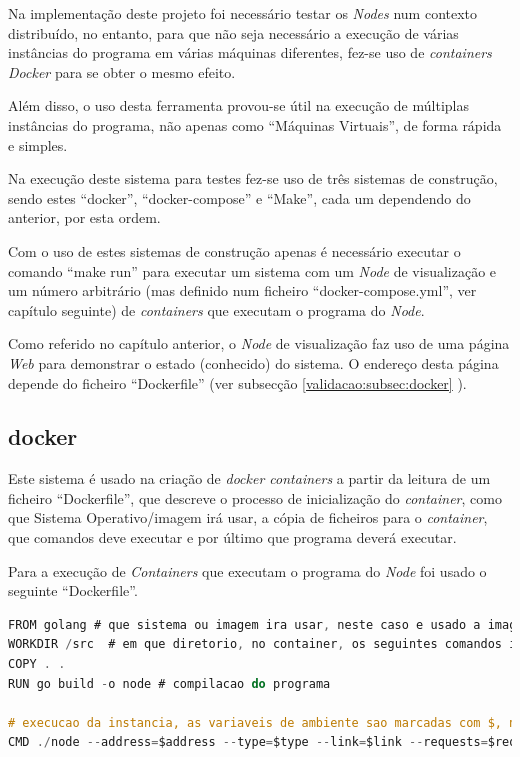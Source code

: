 Na implementação deste projeto foi necessário testar os \emph{Nodes} num contexto distribuído, no entanto, para que não seja necessário a execução de várias instâncias do programa em várias máquinas diferentes, fez-se uso de \emph{containers Docker} para se obter o mesmo efeito.

Além disso, o uso desta ferramenta provou-se útil na execução de múltiplas instâncias do programa, não apenas como ``Máquinas Virtuais'', de forma rápida e simples.

Na execução deste sistema para testes fez-se uso de três sistemas de construção, sendo estes ``docker'', ``docker-compose'' e ``Make'', cada um dependendo do anterior, por esta ordem.

Com o uso de estes sistemas de construção apenas é necessário executar o comando ``make run'' para executar um sistema com um \emph{Node} de visualização e um número arbitrário (mas definido num ficheiro ``docker-compose.yml'', ver capítulo seguinte) de \emph{containers} que executam o programa do \emph{Node}.

Como referido no capítulo anterior, o \emph{Node} de visualização faz uso de uma página \emph{Web} para demonstrar o estado (conhecido) do sistema. O endereço desta página depende do ficheiro ``Dockerfile'' (ver subsecção 
\ref{validacao:subsec:docker}
).


\subsection*{docker}
\label{validacao:subsec:docker}
Este sistema é usado na criação de \emph{docker containers} a partir da leitura de um ficheiro ``Dockerfile'', que descreve o processo de inicialização do \emph{container}, como que Sistema Operativo/imagem irá usar, a cópia de ficheiros para o \emph{container}, que comandos deve executar e por último que programa deverá executar.


Para a execução de \emph{Containers} que executam o programa do \emph{Node} foi usado o seguinte ``Dockerfile''.
\begin{lstlisting}[caption={``Dockerfile'' do \emph{Node}},language=C]
FROM golang # que sistema ou imagem ira usar, neste caso e usado a imagem ``golang''
WORKDIR /src  # em que diretorio, no container, os seguintes comandos irao ser executados
COPY . .
RUN go build -o node # compilacao do programa

# execucao da instancia, as variaveis de ambiente sao marcadas com $, no entanto serao descritas a sua origem de seguida
CMD ./node --address=$address --type=$type --link=$link --requests=$requests --visualization=$VIS_ADDRESS
\end{lstlisting}
 
